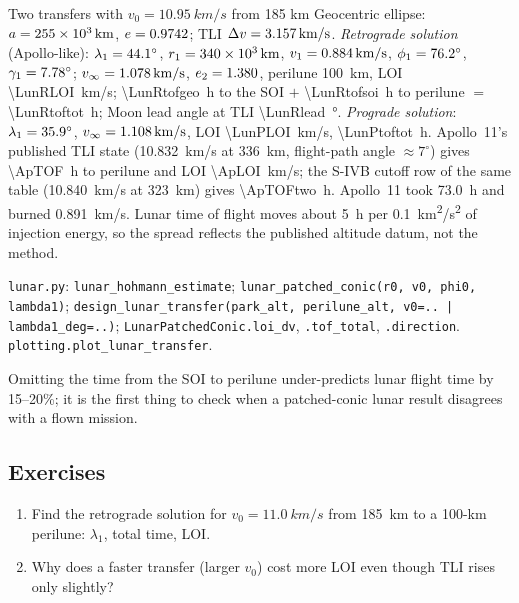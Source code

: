 \documentclass[11pt,letterpaper,oneside]{report}
\newcommand{\dv}{\Delta v}
\newcommand{\vinf}{v_\infty}
\newcommand{\code}[1]{\texttt{#1}}
\begin{document}
\begin{worked}{Two transfers with $v_0=\SI{10.95}{km/s}$ from 185 km}
Geocentric ellipse: $a=\SI{255e3}{km}$, $e=0.9742$; TLI $\dv=\SI{\LunRTLI}{km/s}$.
\emph{Retrograde solution} (Apollo-like): $\lambda_1=\SI{44.1}{\degree}$, $r_1=\SI{340e3}{km}$,
$v_1=\SI{0.884}{km/s}$, $\phi_1=\SI{76.2}{\degree}$, $\gamma_1=\SI{7.78}{\degree}$;
$\vinf=\SI{\LunRvinf}{km/s}$, $e_2=1.380$, perilune 100~km, LOI \SI{\LunRLOI}{km/s};
\SI{\LunRtofgeo}{h} to the SOI $+$ \SI{\LunRtofsoi}{h} to perilune $=$ \SI{\LunRtoftot}{h}; Moon
lead angle at TLI \SI{\LunRlead}{\degree}.
\emph{Prograde solution}: $\lambda_1=\SI{35.9}{\degree}$, $\vinf=\SI{\LunPvinf}{km/s}$, LOI \SI{\LunPLOI}{km/s},
\SI{\LunPtoftot}{h}.
Apollo~11's published TLI state (\SI{10.832}{km/s} at \SI{336}{km}, flight-path angle $\approx7^\circ$)
gives \SI{\ApTOF}{h} to perilune and LOI \SI{\ApLOI}{km/s}; the S-IVB cutoff row of the same
table (\SI{10.840}{km/s} at \SI{323}{km}) gives \SI{\ApTOFtwo}{h}. Apollo~11 took \SI{73.0}{h} and
burned \SI{0.891}{km/s}. Lunar time of flight moves about \SI{5}{h} per \SI{0.1}{km^2/s^2} of
injection energy, so the spread reflects the published altitude datum, not the method.
\end{worked}

\begin{codebox}
\code{lunar.py}: \code{lunar\_hohmann\_estimate}; \code{lunar\_patched\_conic(r0, v0, phi0, lambda1)};
\code{design\_lunar\_transfer(park\_alt, perilune\_alt, v0=.. | lambda1\_deg=..)};
\code{LunarPatchedConic.loi\_dv}, \code{.tof\_total}, \code{.direction}. \code{plotting.plot\_lunar\_transfer}.
\end{codebox}

\begin{pitfall}
Omitting the time from the SOI to perilune under-predicts lunar flight time by 15--20\%; it is the
first thing to check when a patched-conic lunar result disagrees with a flown mission.
\end{pitfall}

\subsection*{Exercises}
\begin{enumerate}[label=6.\arabic*,nosep]
\item Find the retrograde solution for $v_0=\SI{11.0}{km/s}$ from 185~km to a 100-km perilune: $\lambda_1$, total time, LOI.
\item Why does a faster transfer (larger $v_0$) cost more LOI even though TLI rises only slightly?
\end{enumerate}
\end{document}
